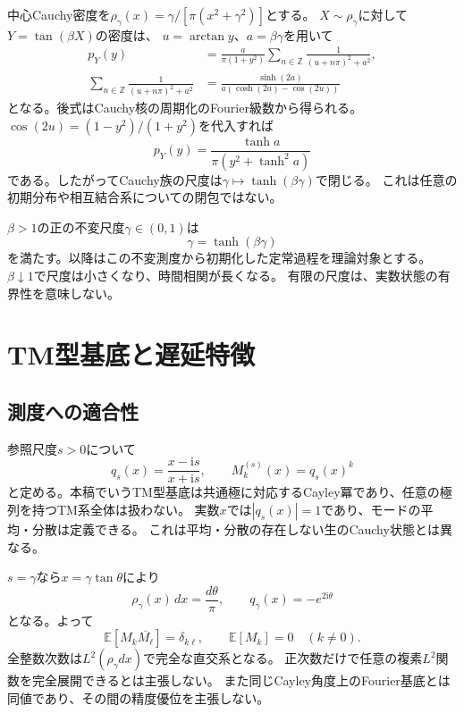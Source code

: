 \documentclass[a4paper,11pt]{jlreq}
\newcommand{\ii}{\mathrm{i}}
\newcommand{\E}{\mathbb{E}}
\begin{document}
中心Cauchy密度を$\rho_\gamma(x)=\gamma/[\pi(x^2+\gamma^2)]$とする。
$X\sim\rho_\gamma$に対して$Y=\tan(\beta X)$の密度は、
$u=\arctan y$、$a=\beta\gamma$を用いて
\begin{align}
p_Y(y)&=\frac{a}{\pi(1+y^2)}
 \sum_{n\in\mathbb Z}\frac1{(u+n\pi)^2+a^2},\\
\sum_{n\in\mathbb Z}\frac1{(u+n\pi)^2+a^2}
&=\frac{\sinh(2a)}{a(\cosh(2a)-\cos(2u))}
\end{align}
となる。後式はCauchy核の周期化のFourier級数から得られる。
$\cos(2u)=(1-y^2)/(1+y^2)$を代入すれば
\begin{equation}
p_Y(y)=\frac{\tanh a}{\pi(y^2+\tanh^2 a)}
\end{equation}
である。したがってCauchy族の尺度は$\gamma\mapsto\tanh(\beta\gamma)$で閉じる\cite{e0}。
これは任意の初期分布や相互結合系についての閉包ではない。

$\beta>1$の正の不変尺度$\gamma\in(0,1)$は
\begin{equation}
\gamma=\tanh(\beta\gamma)
\label{eq:gamma}
\end{equation}
を満たす。以降はこの不変測度から初期化した定常過程を理論対象とする。
$\beta\downarrow1$で尺度は小さくなり、時間相関が長くなる。
有限の尺度は、実数状態の有界性を意味しない。

\section{TM型基底と遅延特徴}
\subsection{測度への適合性}
参照尺度$s>0$について
\begin{equation}
q_s(x)=\frac{x-\ii s}{x+\ii s},\qquad M_k^{(s)}(x)=q_s(x)^k
\end{equation}
と定める。本稿でいうTM型基底は共通極に対応するCayley冪であり、任意の極列を持つTM系全体は扱わない。
実数$x$では$|q_s(x)|=1$であり、モードの平均・分散は定義できる。
これは平均・分散の存在しない生のCauchy状態とは異なる。

$s=\gamma$なら$x=\gamma\tan\theta$により
\begin{equation}
\rho_\gamma(x)\,dx=\frac{d\theta}{\pi},\qquad q_\gamma(x)=-e^{2\ii\theta}
\end{equation}
となる。よって
\begin{equation}
\E[M_k\overline{M_\ell}]=\delta_{k\ell},\qquad
\E[M_k]=0\quad(k\ne0).
\end{equation}
全整数次数は$L^2(\rho_\gamma dx)$で完全な直交系となる。
正次数だけで任意の複素$L^2$関数を完全展開できるとは主張しない。
また同じCayley角度上のFourier基底とは同値であり、その間の精度優位を主張しない。
\end{document}
